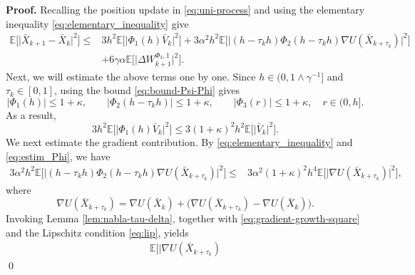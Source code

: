 \documentclass[12pt]{article}
\numberwithin{equation}{section}
\renewenvironment{proof}%
  {\begin{trivlist}%
   \item[]\ignorespaces}%
  {\qed\end{trivlist}}
\begin{document}
\begin{proof}
\textbf{Proof.}
Recalling the position update in \eqref{eq:uni-process} and using the elementary inequality \eqref{eq:elementary_inequality} give
\begin{equation}
\label{eq:X-increment-split-clear}
\begin{aligned}
\mathbb{E}
\Big[
\big|
\bar{X}_{k+1}
-
\bar{X}_{k}
\big|^2
\Big]
\leq  &
3h^2
\mathbb{E}
\Big[
\big|
\Phi_1(h)\bar{V}_k
\big|^2
\Big]
+
3\alpha^2h^2
\mathbb{E}
\Big[
\big|
(h-\tau_kh)\Phi_2(h-\tau_kh)
\nabla U(\bar{X}_{k+\tau_k})
\big|^2
\Big]
\\  &
+
6\gamma\alpha
\mathbb{E}
\Big[
\big|
\Delta W_{k+1}^{\Phi_3,1}
\big|^2
\Big].
\end{aligned}
\end{equation}
Next, we will estimate the above terms one by one. 
Since $h\in(0,1\wedge\gamma^{-1}]$ and $\tau_k\in[0,1]$, using the bound \eqref{eq:bound-Psi-Phi} gives
\begin{equation}
\label{eq:estim_Phi}
|\Phi_1(h)|
\leq
1+\kappa,
\qquad
|\Phi_2
(h-\tau_kh)|
\leq
1+\kappa,
\qquad
|\Phi_3
(r)|
\leq
1+\kappa,
\quad 
r \in  (0,h].
\end{equation}
As a result,
\begin{equation}\label{eq:X-velocity-part-clear}
3h^2
\mathbb{E}
\Big[
\big|
\Phi_1(h)\bar{V}_k
\big|^2
\Big]
\leq
3(1+\kappa)^2h^2
\mathbb{E}
\Big[
\big|
\bar{V}_k
\big|^2
\Big].
\end{equation}
We next estimate the gradient contribution. 
By \eqref{eq:elementary_inequality} and  \eqref{eq:estim_Phi}, we have
\begin{equation}
\label{eq:X-gradient-part-clear-1}
\begin{aligned}
3\alpha^2h^2
\mathbb{E}
\Big[
\big|
(h-\tau_kh)
\Phi_2
(h-\tau_kh)
\nabla U(\bar{X}_{k+\tau_k})
\big|^2
\Big]
\leq    &
3\alpha^2(1+\kappa)^2h^4
\mathbb{E}
\Big[
\big|
\nabla 
U(\bar{X}_{k+\tau_k})
\big|^2
\Big],
\end{aligned}
\end{equation}
where
\[
\nabla U(\bar{X}_{k+\tau_k})
=
\nabla U(\bar{X}_k)
+
\big(
\nabla U(\bar{X}_{k+\tau_k})
-
\nabla U(\bar{X}_k)
\big).
\]
Invoking  Lemma \ref{lem:nabla-tau-delta}, together with \eqref{eq:gradient-growth-square} and the Lipschitz condition \eqref{eq:lip}, yields
\begin{equation}
\label{eq:grad-Xtau-split-clear}
\begin{aligned}
\mathbb{E}
\Big[
\big|
\nabla U(\bar{X}_{k+\tau_k})

\end{aligned}
\end{equation}
\end{proof}
\end{document}
